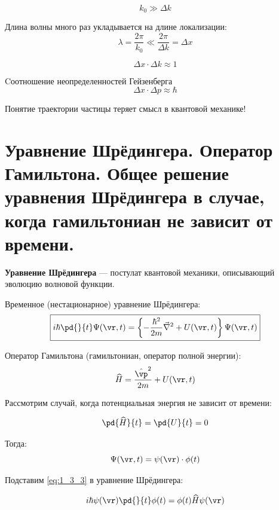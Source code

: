 $$k_0 \gg \Delta k$$

Длина волны много раз укладывается на длине локализации:
$$\lambda = \frac{2 \pi}{k_0} \ll \frac{2 \pi}{\Delta k} = \Delta x$$

\begin{equation}
\label{eq:1_2_9}
\Delta x \cdot \Delta k \approx 1
\end{equation}

Cоотношение неопределенностей Гейзенберга
\begin{equation}
\label{eq:1_2_10}
\boxed{\Delta x \cdot \Delta p \approx \hbar}
\end{equation}

Понятие траектории частицы теряет смысл в квантовой механике!

\begin{sloppypar}
  \section{Уравнение Шрёдингера. Оператор Гамильтона. Общее решение уравнения Шрёдингера в случае, когда гамильтониан не зависит от времени.}
\end{sloppypar}

\textbf{Уравнение Шрёдингера} --- постулат квантовой механики, описывающий эволюцию волновой функции.

Временное (нестационарное) уравнение Шрёдингера:
\begin{equation}
\label{eq:1_3_1}
\boxed{i \hbar \pd{}{t} \Psi(\vr,t) = \left\{ -\frac{\hbar^2}{2m}\vec{\nabla}^2 + U(\vr,t) \right\} \Psi(\vr,t)} 
\end{equation}

Оператор Гамильтона (гамильтониан, оператор полной энергии):
\begin{equation}
\label{eq:1_3_2}
\widehat{H} = \frac{\hat{\vp}^2}{2m} + U(\vr,t)
\end{equation}

Рассмотрим случай, когда потенциальная энергия не зависит от времени:

$$\pd{\widehat{H}}{t} = \pd{U}{t} = 0 $$

Тогда:
\begin{equation}
\label{eq:1_3_3}
\Psi(\vr,t) = \psi(\vr) \cdot \phi (t)
\end{equation}

Подставим \eqref{eq:1_3_3} в уравнение Шрёдингера:

$$i \hbar \psi(\vr) \pd{}{t} \phi (t) = \phi (t) \widehat{H} \psi(\vr)$$

